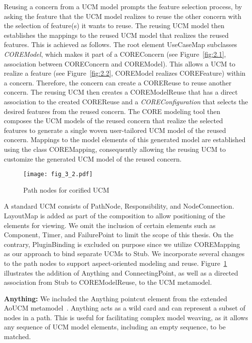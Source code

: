 Reusing a concern from a UCM model prompts the feature selection process, by asking the feature that the UCM model realizes to reuse the other concern with the selection of feature(s) it wants to reuse. The reusing UCM model then establishes the mappings to the reused UCM model that realizes the reused features. This is achieved as follows. The root element {\cls UseCaseMap} subclasses \textit{\cls COREModel}, which makes it part of a {\cls COREConcern} (see Figure~\ref{fig:2.1}, association between {\cls COREConcern} and {\cls COREModel}). This allows a UCM to realize a feature (see Figure~\ref{fig:2.2}, {\cls COREModel} realizes {\cls COREFeature}) within a concern. Therefore, the concern can create a {\cls COREReuse} to reuse another concern. The reusing UCM then creates a {\cls COREModelReuse} that has a direct association to the created {\cls COREReuse} and a \textit{\cls COREConfiguration} that selects the desired features from the reused concern. The CORE modeling tool then composes the UCM models of the reused concern that realize the selected features to generate a single woven user-tailored UCM model of the reused concern. Mappings to the model elements of this generated model are established using the class {\cls COREMapping}, consequently allowing the reusing UCM to customize the generated UCM model of the reused concern.

\begin{figure}
	\centering
	\texttt{[image: fig\_3\_2.pdf]}
	\caption{Path nodes for corified UCM}
	\label{fig:3.2}
\end{figure}

A standard UCM consists of {\cls PathNode}, {\cls Responsibility}, and {\cls NodeConnection}. {\cls LayoutMap} is added as part of the composition to allow positioning of the elements for viewing. We omit the inclusion of certain elements such as {\cls Component}, {\cls Timer}, and {\cls FailurePoint} to limit the scope of this thesis. On the contrary, {\cls PluginBinding} is excluded on purpose since we utilize {\cls COREMapping} as our approach to bind separate UCMs to {\cls Stub}. We incorporate several changes to the path nodes to support aspect-oriented modeling and reuse. Figure~\ref{fig:3.2} illustrates the addition of {\cls Anything} and {\cls ConnectingPoint}, as well as a directed association from {\cls Stub} to {\cls COREModelReuse}, to the UCM metamodel.

\textbf{\cls Anything:} We included the {\cls Anything} pointcut element from the extended AoUCM metamodel~\cite{mussbacher2011aspect}. {\cls Anything} acts as a wild card and can represent a subset of nodes in a path. This is useful for facilitating complex model weaving, as it allows any sequence of UCM model elements, including an empty sequence, to be matched.

